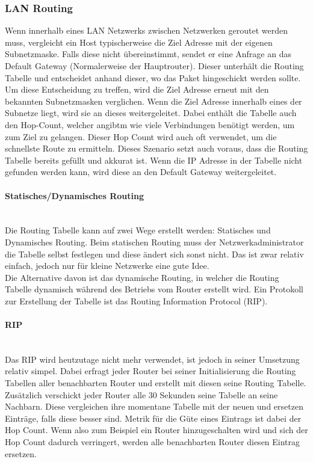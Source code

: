 \documentclass{article}
\newcommand{\paragraphlb}[1]{\paragraph{#1}\mbox{}\\}
\begin{document}
	 \subsubsection{LAN Routing}
	 Wenn innerhalb eines LAN Netzwerks zwischen Netzwerken geroutet werden muss, vergleicht ein Host typischerweise die Ziel Adresse mit der eigenen Subnetzmaske. Falls diese nicht übereinstimmt, sendet er eine Anfrage an das Default Gateway (Normalerweise der Hauptrouter). Dieser unterhält die Routing Tabelle und entscheidet anhand dieser, wo das Paket hingeschickt werden sollte. Um diese Entscheidung zu treffen, wird die Ziel Adresse erneut mit den bekannten Subnetzmasken verglichen. Wenn die Ziel Adresse innerhalb eines der Subnetze liegt, wird sie an dieses weitergeleitet. Dabei enthält die Tabelle auch den Hop-Count, welcher angibtm wie viele Verbindungen benötigt werden, um zum Ziel zu gelangen. Dieser Hop Count wird auch oft verwendet, um die schnellste Route zu ermitteln. Dieses Szenario setzt auch voraus, dass die Routing Tabelle bereits gefüllt und akkurat ist. Wenn die IP Adresse in der Tabelle nicht gefunden werden kann, wird diese an den Default Gateway weitergeleitet. \\
	 \paragraphlb{Statisches/Dynamisches Routing}
	 Die Routing Tabelle kann auf zwei Wege erstellt werden: Statisches und Dynamisches Routing. Beim statischen Routing muss der Netzwerkadministrator die Tabelle selbst festlegen und diese ändert sich sonst nicht. Das ist zwar relativ einfach, jedoch nur für kleine Netzwerke eine gute Idee. \\
	 Die Alternative davon ist das dynamische Routing, in welcher die Routing Tabelle dynamisch während des Betriebs vom Router erstellt wird. Ein Protokoll zur Erstellung der Tabelle ist das Routing Information Protocol (RIP). \\
	 \paragraphlb{RIP}
	 Das RIP wird heutzutage nicht mehr verwendet, ist jedoch in seiner Umsetzung relativ simpel. Dabei erfragt jeder Router bei seiner Initialisierung die Routing Tabellen aller benachbarten Router und erstellt mit diesen seine Routing Tabelle. Zusätzlich verschickt jeder Router alle 30 Sekunden seine Tabelle an seine Nachbarn. Diese vergleichen ihre momentane Tabelle mit der neuen und ersetzen Einträge, falls diese besser sind. Metrik für die Güte eines Eintrags ist dabei der Hop Count. Wenn also zum Beispiel ein Router hinzugeschalten wird und sich der Hop Count dadurch verringert, werden alle benachbarten Router diesen Eintrag ersetzen.
\end{document}
